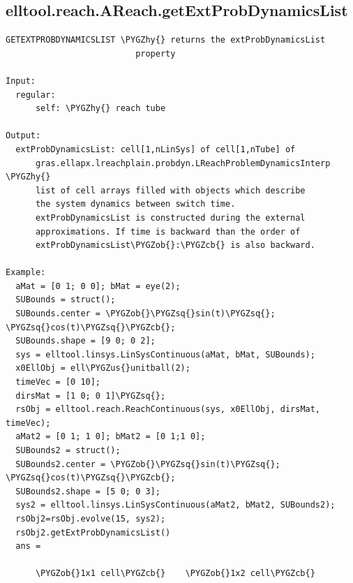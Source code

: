 \documentclass[letterpaper,10pt,english]{sphinxmanual}
\def\PYGZus{\char`\_}
\def\PYGZob{\char`\{}
\def\PYGZcb{\char`\}}
\def\PYGZhy{\char`\-}
\def\PYGZsq{\char`\'}
\begin{document}
\subsection{elltool.reach.AReach.getExtProbDynamicsList}
\label{chap_functions:elltool-reach-areach-getextprobdynamicslist}
\begin{Verbatim}[commandchars=\\\{\}]
GETEXTPROBDYNAMICSLIST \PYGZhy{} returns the extProbDynamicsList
                          property

Input:
  regular:
      self: \PYGZhy{} reach tube

Output:
  extProbDynamicsList: cell[1,nLinSys] of cell[1,nTube] of
      gras.ellapx.lreachplain.probdyn.LReachProblemDynamicsInterp \PYGZhy{}
      list of cell arrays filled with objects which describe
      the system dynamics between switch time.
      extProbDynamicsList is constructed during the external
      approximations. If time is backward than the order of
      extProbDynamicsList\PYGZob{}:\PYGZcb{} is also backward.

Example:
  aMat = [0 1; 0 0]; bMat = eye(2);
  SUBounds = struct();
  SUBounds.center = \PYGZob{}\PYGZsq{}sin(t)\PYGZsq{}; \PYGZsq{}cos(t)\PYGZsq{}\PYGZcb{};
  SUBounds.shape = [9 0; 0 2];
  sys = elltool.linsys.LinSysContinuous(aMat, bMat, SUBounds);
  x0EllObj = ell\PYGZus{}unitball(2);
  timeVec = [0 10];
  dirsMat = [1 0; 0 1]\PYGZsq{};
  rsObj = elltool.reach.ReachContinuous(sys, x0EllObj, dirsMat, timeVec);
  aMat2 = [0 1; 1 0]; bMat2 = [0 1;1 0];
  SUBounds2 = struct();
  SUBounds2.center = \PYGZob{}\PYGZsq{}sin(t)\PYGZsq{}; \PYGZsq{}cos(t)\PYGZsq{}\PYGZcb{};
  SUBounds2.shape = [5 0; 0 3];
  sys2 = elltool.linsys.LinSysContinuous(aMat2, bMat2, SUBounds2);
  rsObj2=rsObj.evolve(15, sys2);
  rsObj2.getExtProbDynamicsList()
  ans =

      \PYGZob{}1x1 cell\PYGZcb{}    \PYGZob{}1x2 cell\PYGZcb{}
\end{Verbatim}
\end{document}
